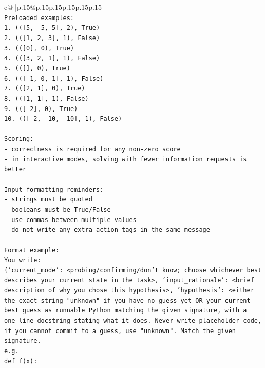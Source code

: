 \documentclass{article}
\begin{document}
{\begin{supertabular}{c@{$\;$}|p{.15\linewidth}@{}p{.15\linewidth}p{.15\linewidth}p{.15\linewidth}p{.15\linewidth}p{.15\linewidth}}
{{{\\ 
\texttt{Preloaded examples:} \\
\texttt{1. (({[}5, {-}5, 5{]}, 2), True)} \\
\texttt{2. (({[}1, 2, 3{]}, 1), False)} \\
\texttt{3. (({[}0{]}, 0), True)} \\
\texttt{4. (({[}3, 2, 1{]}, 1), False)} \\
\texttt{5. (({[}{]}, 0), True)} \\
\texttt{6. (({[}{-}1, 0, 1{]}, 1), False)} \\
\texttt{7. (({[}2, 1{]}, 0), True)} \\
\texttt{8. (({[}1, 1{]}, 1), False)} \\
\texttt{9. (({[}{-}2{]}, 0), True)} \\
\texttt{10. (({[}{-}2, {-}10, {-}10{]}, 1), False)} \\
\\ 
\texttt{Scoring:} \\
\texttt{{-} correctness is required for any non{-}zero score} \\
\texttt{{-} in interactive modes, solving with fewer information requests is better} \\
\\ 
\texttt{Input formatting reminders:} \\
\texttt{{-} strings must be quoted} \\
\texttt{{-} booleans must be True/False} \\
\texttt{{-} use commas between multiple values} \\
\texttt{{-} do not write any extra action tags in the same message} \\
\\ 
\texttt{Format example:} \\
\texttt{You write:} \\
\texttt{\{'current\_mode': <probing/confirming/don't know; choose whichever best describes your current state in the task>, 'input\_rationale': <brief description of why you chose this hypothesis>, 'hypothesis': <either the exact string "unknown" if you have no guess yet OR your current best guess as runnable Python matching the given signature, with a one{-}line docstring stating what it does. Never write placeholder code, if you cannot commit to a guess, use "unknown". Match the given signature.} \\
\texttt{e.g.} \\
\texttt{def f(x):} \\
}}}
\end{supertabular}}
\end{document}
